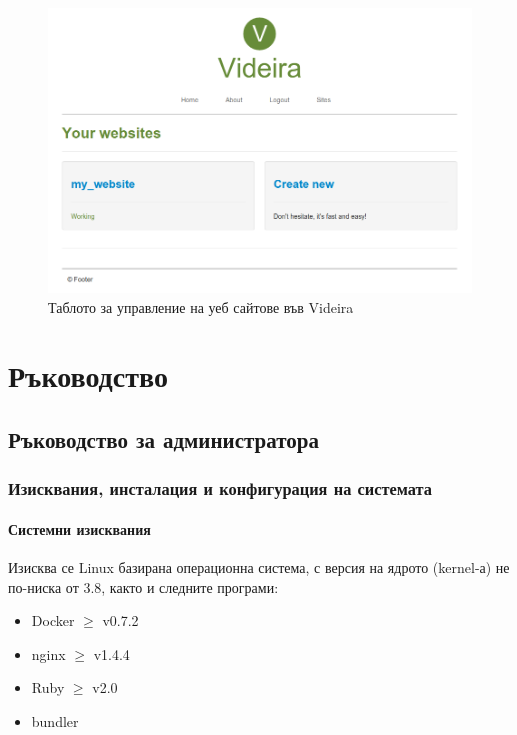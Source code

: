 \documentclass[pdftex,14pt,a4paper]{extreport}
\begin{document}
\begin{figure}[h]
  \centering
  \includegraphics [scale=0.4]{./videira_tenants}
  \caption {Таблото за управление на уеб сайтове във Videira}
\end{figure}
\chapter {Ръководство}
\section {Ръководство за администратора}
\subsection {Изисквания, инсталация и конфигурация на системата}
\subsubsection {Системни изисквания}
Изисква се Linux базирана операционна система, с версия на ядрото (kernel-а) не по-ниска от 3.8, както и следните програми:
\begin{itemize}
  \item Docker  $\ge$ v0.7.2
  \item nginx  $\ge$ v1.4.4
  \item Ruby   $\ge$ v2.0
  \item bundler
\end{itemize}
\end{document}
